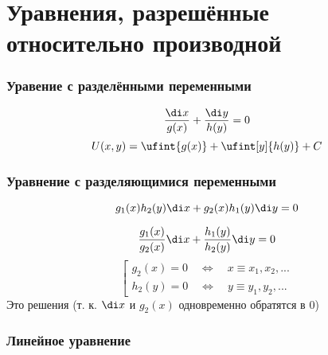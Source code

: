 \part{Уравнения, разрешённые относительно производной}

\section{Уравение с разделёнными переменными}

$$ \frac{\di x}{g(x)} + \frac{\di y}{h(y)} = 0 $$
$$ U(x, y) = \ufint{g(x)} + \ufint[y]{h(y)} + C $$

\section{Уравнение с разделяющимися переменными}

$$ g_1(x)h_2(y)\di x + g_2(x)h_1(y)\di y = 0 $$
\antlersimp
\begin{multicols}{2}
    $$ \frac{g_1(x)}{g_2(x)}\di x + \frac{h_1(y)}{h_2(y)}\di y = 0 $$
    \columnbreak
    $$ \left[
    \begin{aligned}
        g_2(x) = 0 \quad \iff \quad x \equiv x_1, x_2, ... \\
        h_2(y) = 0 \quad \iff \quad y \equiv y_1, y_2, ...
    \end{aligned} \right. $$
    Это решения (т. к. $ \di x $ и $ g_2(x) $ одновременно обратятся в 0)
\end{multicols}

\section{Линейное уравнение}

